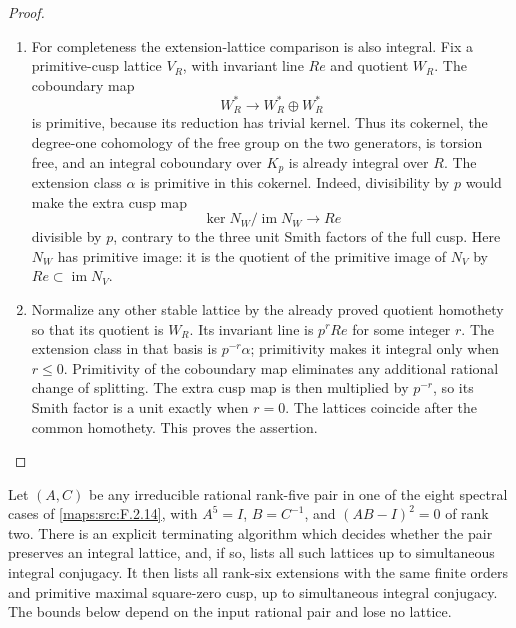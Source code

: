 \begin{proof}
\begin{enumerate}[label={$\langle1\rangle$\arabic*.}]
\item For completeness the extension-lattice comparison is also
integral.  Fix a primitive-cusp lattice $V_R$, with invariant
line $Re$ and quotient $W_R$.
The coboundary map
\[
 W_R^*\longrightarrow W_R^*\oplus W_R^*
\]
is primitive, because its reduction has trivial kernel.
Thus its cokernel, the degree-one cohomology of the free
group on the two generators, is torsion free, and an
integral coboundary over $K_p$ is already integral over $R$.
The extension class $\alpha$ is primitive in this cokernel.
Indeed, divisibility by $p$ would make the extra cusp map
\[
 \ker N_W/\operatorname{im}N_W\longrightarrow Re
\]
divisible by $p$, contrary to the three unit Smith factors
of the full cusp.  Here $N_W$ has primitive image:
it is the quotient of the primitive image of $N_V$ by
$Re\subset\operatorname{im}N_V$.

\item Normalize any other stable lattice by the already proved
quotient homothety so that its quotient is $W_R$.
Its invariant line is $p^rRe$ for some integer $r$.
The extension class in that basis is $p^{-r}\alpha$;
primitivity makes it integral only when $r\leq0$.
Primitivity of the coboundary map eliminates any additional
rational change of splitting.  The extra cusp map is then
multiplied by $p^{-r}$, so its Smith factor is a unit exactly
when $r=0$.  The lattices coincide after the common homothety.
This proves the assertion.

\end{enumerate}
\end{proof}




\begin{theorem}\hypertarget{tag-02NC}{}\label{maps:src:F.2.22}


Let $(A,C)$ be any irreducible rational rank-five pair in
one of the eight spectral cases of \ref{maps:src:F.2.14}, with
$A^5=I$, $B=C^{-1}$, and $(AB-I)^2=0$ of rank two.
There is an explicit terminating algorithm which decides
whether the pair preserves an integral lattice, and, if so,
lists all such lattices up to simultaneous integral conjugacy.
It then lists all rank-six extensions with the same finite
orders and primitive maximal square-zero cusp, up to
simultaneous integral conjugacy.  The bounds below depend on the input rational pair and lose no lattice.

\end{theorem}



